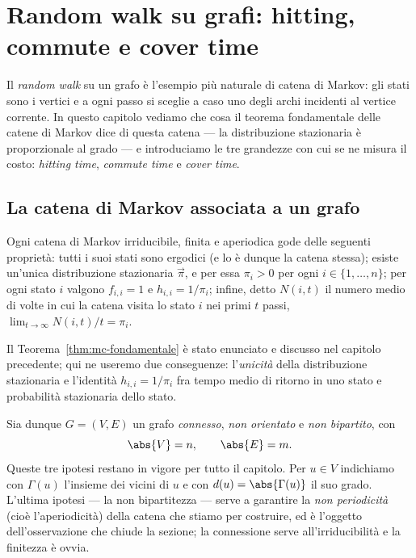 \chapter{Random walk su grafi: hitting, commute e cover time}

Il \emph{random walk} su un grafo è l'esempio più naturale di catena di Markov: gli stati
sono i vertici e a ogni passo si sceglie a caso uno degli archi incidenti al vertice
corrente. In questo capitolo vediamo che cosa il teorema fondamentale delle catene di
Markov dice di questa catena --- la distribuzione stazionaria è proporzionale al grado ---
e introduciamo le tre grandezze con cui se ne misura il costo: \emph{hitting time},
\emph{commute time} e \emph{cover time}.

\section{La catena di Markov associata a un grafo}


\begin{osservazione}
  Ogni catena di Markov irriducibile, finita e aperiodica gode delle seguenti proprietà:
  tutti i suoi stati sono ergodici (e lo è dunque la catena stessa); esiste un'unica
  distribuzione stazionaria $\vec{\pi}$, e per essa $\pi_i > 0$ per ogni
  $i \in \{1,\dots,n\}$; per ogni stato $i$ valgono $f_{i,i} = 1$ e $h_{i,i} = 1/\pi_i$;
  infine, detto $N(i,t)$ il numero medio di volte in cui la catena visita lo stato $i$ nei
  primi $t$ passi, $\lim_{t\to\infty} N(i,t)/t = \pi_i$.

  Il Teorema~\ref{thm:mc-fondamentale} è stato enunciato e discusso nel capitolo precedente;
  qui ne useremo due conseguenze: l'\emph{unicità} della distribuzione stazionaria e l'identità
  $h_{i,i} = 1/\pi_i$ fra tempo medio di ritorno in uno stato e probabilità stazionaria
  dello stato.
\end{osservazione}

Sia dunque $G = (V,E)$ un grafo \emph{connesso}, \emph{non orientato} e \emph{non
bipartito}, con
\[
  \abs{V} = n , \qquad \abs{E} = m .
\]
Queste tre ipotesi restano in vigore per tutto il capitolo. Per $u \in V$ indichiamo con
$\Gamma(u)$ l'insieme dei vicini di $u$ e con $d(u) = \abs{\Gamma(u)}$ il suo grado.
L'ultima ipotesi --- la non bipartitezza --- serve a garantire la \emph{non periodicità}
(cioè l'aperiodicità) della catena che stiamo per costruire, ed è l'oggetto
dell'osservazione che chiude la sezione; la connessione serve all'irriducibilità e la
finitezza è ovvia.

